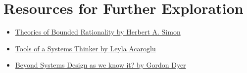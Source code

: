 \section*{Resources for Further Exploration}
\begin{itemize}
\item \href{http://innovbfa.viabloga.com/files/Herbert_Simon___theories_of_bounded_rationality___1972.pdf}{Theories of Bounded Rationality by Herbert A. Simon}
\item \href{https://medium.com/disruptive-design/tools-for-systems-thinkers-the-6-fundamental-concepts-of-systems-thinking-379cdac3dc6a}{Tools of a Systems Thinker by Leyla Acaroglu}
\item \href{http://www.afscet.asso.fr/resSystemica/Crete02/Dyer.pdf}{Beyond Systems Design as we know it? by Gordon Dyer}
\end{itemize}